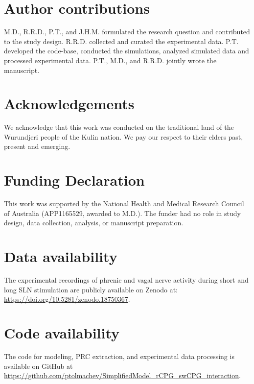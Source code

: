 \documentclass[pdflatex,sn-mathphys-ay]{sn-jnl}%
\theoremstyle{thmstyleone}%
\theoremstyle{thmstyletwo}%
\theoremstyle{thmstylethree}%
\begin{document}

\section*{Author contributions}
M.D., R.R.D., P.T., and J.H.M. formulated the research question and contributed to the study design. R.R.D. collected and curated the experimental data. P.T. developed the code-base, conducted the simulations, analyzed simulated data and processed experimental data. P.T., M.D., and R.R.D. jointly wrote the manuscript.

\section*{Acknowledgements}
We acknowledge that this work was conducted on the traditional land of the Wurundjeri people of the Kulin nation. We pay our respect to their elders past, present and emerging.

\section*{Funding Declaration}
This work was supported by the National Health and Medical Research Council of Australia (APP1165529, awarded to M.D.). The funder had no role in study design, data collection, analysis, or manuscript preparation.

\section*{Data availability}
The experimental recordings of phrenic and vagal nerve activity during short and long SLN stimulation are publicly available on Zenodo at:
\href{https://zenodo.org/records/18750367}{https://doi.org/10.5281/zenodo.18750367}.

\section*{Code availability}
The code for modeling, PRC extraction, and experimental data processing is available on GitHub at \href{https://github.com/ptolmachev/SimplifiedModel_rCPG_swCPG_interaction}{https://github.com/ptolmachev/SimplifiedModel\_rCPG\_swCPG\_interaction}.



\end{document}
